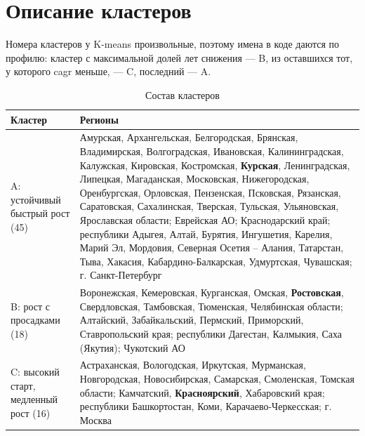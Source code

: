 \documentclass[12pt,a4paper]{report}
\begin{document}
\section{Описание кластеров}

Номера кластеров у K-means произвольные, поэтому имена в коде даются по профилю: кластер с максимальной долей лет снижения --- B, из оставшихся тот, у которого cagr меньше, --- C, последний --- A.

\begin{table}[H]
\centering
\caption{Итоговые кластеры (k = 3)}
\label{tab:clusters}
\small
{}
\end{table}

\begin{table}[H]
\centering
\caption{Состав кластеров}
\label{tab:cluster_lists}
\small
\begin{tabular}{p{3.2cm}p{12.8cm}}
\toprule
Кластер & Регионы \\
\midrule
A: устойчивый быстрый рост (45) & Амурская, Архангельская, Белгородская, Брянская, Владимирская, Волгоградская, Ивановская, Калининградская, Калужская, Кировская, Костромская, \textbf{Курская}, Ленинградская, Липецкая, Магаданская, Московская, Нижегородская, Оренбургская, Орловская, Пензенская, Псковская, Рязанская, Саратовская, Сахалинская, Тверская, Тульская, Ульяновская, Ярославская области; Еврейская АО; Краснодарский край; республики Адыгея, Алтай, Бурятия, Ингушетия, Карелия, Марий Эл, Мордовия, Северная Осетия -- Алания, Татарстан, Тыва, Хакасия, Кабардино-Балкарская, Удмуртская, Чувашская; г. Санкт-Петербург \\
\midrule
B: рост с просадками (18) & Воронежская, Кемеровская, Курганская, Омская, \textbf{Ростовская}, Свердловская, Тамбовская, Тюменская, Челябинская области; Алтайский, Забайкальский, Пермский, Приморский, Ставропольский края; республики Дагестан, Калмыкия, Саха (Якутия); Чукотский АО \\
\midrule
C: высокий старт, медленный рост (16) & Астраханская, Вологодская, Иркутская, Мурманская, Новгородская, Новосибирская, Самарская, Смоленская, Томская области; Камчатский, \textbf{Красноярский}, Хабаровский края; республики Башкортостан, Коми, Карачаево-Черкесская; г. Москва \\
\bottomrule
\end{tabular}
\end{table}
\end{document}
